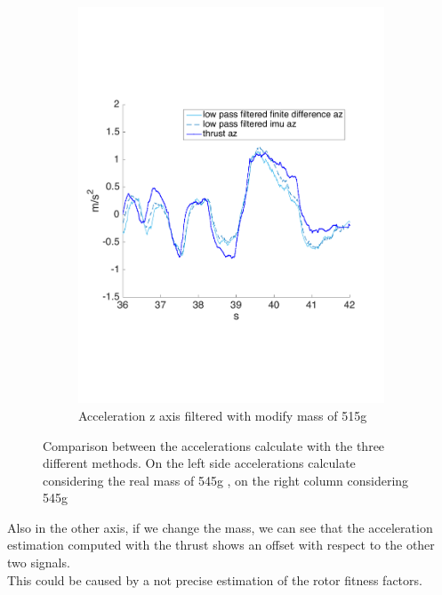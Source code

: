 \begin{figure}[!htbp]
\begin{subfigure}[b]{0.45\textwidth}
     \includegraphics[width=\textwidth]{img/acceleration_mass_changed_filtered_z.pdf}
        \caption{Acceleration z axis filtered with modify mass of 515g}
        \label{fig:comparison_accz_fil_mass}
   \end{subfigure}
    \caption{Comparison between the accelerations calculate with the three different methods. On the left side accelerations calculate considering the real mass of 545g , on the right column considering 545g}
    \label{fig:comparison_acc_mass}
\end{figure}

Also in the other axis, if we change the mass, we can see that the acceleration estimation computed with the thrust shows an offset with respect to the other two signals.\\ This could be caused by a not precise estimation of the rotor fitness factors.\\

